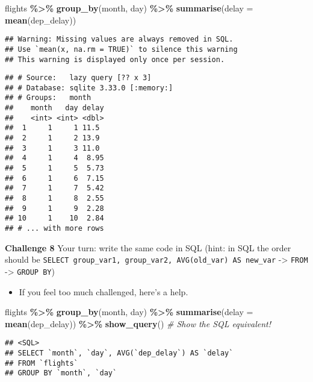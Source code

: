 \documentclass[
]{book}
\newenvironment{Shaded}{\begin{snugshade}}{\end{snugshade}}
\newcommand{\CommentTok}[1]{\textcolor[rgb]{0.56,0.35,0.01}{\textit{#1}}}
\newcommand{\DataTypeTok}[1]{\textcolor[rgb]{0.13,0.29,0.53}{#1}}
\newcommand{\KeywordTok}[1]{\textcolor[rgb]{0.13,0.29,0.53}{\textbf{#1}}}
\newcommand{\NormalTok}[1]{#1}
\newcommand{\OperatorTok}[1]{\textcolor[rgb]{0.81,0.36,0.00}{\textbf{#1}}}
\newcommand{\StringTok}[1]{\textcolor[rgb]{0.31,0.60,0.02}{#1}}
\providecommand{\tightlist}{%
  \setlength{\itemsep}{0pt}\setlength{\parskip}{0pt}}
\begin{document}
\begin{Shaded}
\begin{Highlighting}[]
\NormalTok{flights }\OperatorTok{\%\textgreater{}\%}
\StringTok{  }\KeywordTok{group\_by}\NormalTok{(month, day) }\OperatorTok{\%\textgreater{}\%}
\StringTok{  }\KeywordTok{summarise}\NormalTok{(}\DataTypeTok{delay =} \KeywordTok{mean}\NormalTok{(dep\_delay)) }
\end{Highlighting}
\end{Shaded}

\begin{verbatim}
## Warning: Missing values are always removed in SQL.
## Use `mean(x, na.rm = TRUE)` to silence this warning
## This warning is displayed only once per session.
\end{verbatim}

\begin{verbatim}
## # Source:   lazy query [?? x 3]
## # Database: sqlite 3.33.0 [:memory:]
## # Groups:   month
##    month   day delay
##    <int> <int> <dbl>
##  1     1     1 11.5 
##  2     1     2 13.9 
##  3     1     3 11.0 
##  4     1     4  8.95
##  5     1     5  5.73
##  6     1     6  7.15
##  7     1     7  5.42
##  8     1     8  2.55
##  9     1     9  2.28
## 10     1    10  2.84
## # ... with more rows
\end{verbatim}

\textbf{Challenge 8}
Your turn: write the same code in SQL (hint: in SQL the order should be \texttt{SELECT\ group\_var1,\ group\_var2,\ AVG(old\_var)\ AS\ new\_var} -\textgreater{} \texttt{FROM} -\textgreater{} \texttt{GROUP\ BY})

\begin{itemize}
\tightlist
\item
  If you feel too much challenged, here's a help.
\end{itemize}

\begin{Shaded}
\begin{Highlighting}[]
\NormalTok{flights }\OperatorTok{\%\textgreater{}\%}
\StringTok{  }\KeywordTok{group\_by}\NormalTok{(month, day) }\OperatorTok{\%\textgreater{}\%}
\StringTok{  }\KeywordTok{summarise}\NormalTok{(}\DataTypeTok{delay =} \KeywordTok{mean}\NormalTok{(dep\_delay)) }\OperatorTok{\%\textgreater{}\%}
\StringTok{  }\KeywordTok{show\_query}\NormalTok{() }\CommentTok{\# Show the SQL equivalent!}
\end{Highlighting}
\end{Shaded}

\begin{verbatim}
## <SQL>
## SELECT `month`, `day`, AVG(`dep_delay`) AS `delay`
## FROM `flights`
## GROUP BY `month`, `day`
\end{verbatim}
\end{document}
